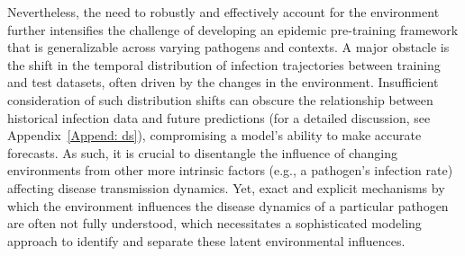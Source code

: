 Nevertheless, the need to robustly and effectively account for the environment further intensifies the challenge of developing an epidemic pre-training framework that is generalizable across varying pathogens and contexts.
A major obstacle is the shift in the temporal distribution of infection trajectories between training and test datasets, often driven by the changes in the environment.
Insufficient consideration of such distribution shifts can obscure the relationship between historical infection data and future predictions (for a detailed discussion, see Appendix~\ref{Append: ds}), compromising a model's ability to make accurate forecasts.
As such, it is crucial to disentangle the influence of changing environments from other more intrinsic factors (e.g., a pathogen's infection rate) affecting disease transmission dynamics. Yet, exact and explicit mechanisms by which the environment influences the disease dynamics of a particular pathogen are often not fully understood, which necessitates a sophisticated modeling approach to identify and separate these latent environmental influences.


